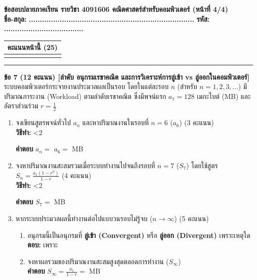 \documentclass[a4paper,12pt]{article}
\newcounter{examline}
\newcommand{\examlines}[1]{%
  \setcounter{examline}{0}%
  \loop\ifnum\value{examline}<#1\relax
    \par\vspace{0.68em}\noindent\textcolor{gray!40}{\hrulefill}%
    \stepcounter{examline}%
  \repeat
}
\newcommand{\examheadpage}[3]{%
  \noindent
  \begin{minipage}[c]{0.75\textwidth}
    {\normalsize\bfseries\color{navy} ข้อสอบปลายภาคเรียน รายวิชา 4091606 คณิตศาสตร์สำหรับคอมพิวเตอร์ (หน้าที่ #3/4)}\\[0.15em]
    \textbf{ชื่อ-สกุล:} {\large\bfseries #1} \qquad \textbf{รหัส:} {\large\bfseries #2}
  \end{minipage}\hfill
  \begin{minipage}[c]{0.23\textwidth}
    \flushright
    \begin{tabular}{|m{2.0cm}|}
      \hline
      \centering\scriptsize\textbf{คะแนนหน้านี้ (25)} \tabularnewline
      \hline
      \vspace{0.45cm} \tabularnewline
      \hline
    \end{tabular}
  \end{minipage}
  \par\vspace{0.2em}\hrule\vspace{0.35em}
}
\begin{document}
\clearpage

\examheadpage{...........................................................................}{....................................}{4}

\noindent\textbf{ข้อ 7 (12 คะแนน) [ลำดับ อนุกรมเรขาคณิต และการวิเคราะห์การลู่เข้า vs ลู่ออกในคอมพิวเตอร์]} \\
ระบบคอมพิวเตอร์กระจายงานประมวลผลเป็นรอบ โดยในแต่ละรอบ $n$ (สำหรับ $n = 1, 2, 3, \dots$) มีปริมาณภาระงาน (Workload) ตามลำดับเรขาคณิต ซึ่งมีพจน์แรก $a_1 = 128$ เมกะไบต์ (MB) และอัตราส่วนร่วม $r = \frac{1}{2}$
\begin{enumerate}[label=7.\arabic*), itemsep=3.5pt]
  \item จงเขียนสูตรพจน์ทั่วไป $a_n$ และหาปริมาณงานในรอบที่ $n = 6$ ($a_6$) (3 คะแนน)\\
  \noindent\textbf{วิธีทำ:}
  \examlines{2}
  \noindent\textbf{คำตอบ} $a_n =$ \makebox[4.5cm]{\dotfill} \qquad\qquad $a_6 =$ \makebox[4.0cm]{\dotfill} MB

  \item จงหาปริมาณงานสะสมรวมเมื่อระบบทำงานไปจนถึงรอบที่ $n = 7$ ($S_7$) โดยใช้สูตร $S_n = \frac{a_1(1 - r^n)}{1 - r}$ (4 คะแนน)\\
  \noindent\textbf{วิธีทำ:}
  \examlines{2}
  \noindent\textbf{คำตอบ} $S_7 =$ \makebox[6.5cm]{\dotfill} MB

  \item หากระบบประมวลผลนี้ทำงานต่อไปแบบวนรอบไม่รู้จบ ($n \to \infty$) (5 คะแนน)
  \begin{enumerate}[label=(\alph*), itemsep=2pt]
    \item อนุกรมนี้เป็นอนุกรมที่ \textbf{ลู่เข้า (Convergent)} หรือ \textbf{ลู่ออก (Divergent)} เพราะเหตุใด\\
    \noindent\textbf{ตอบ:} \makebox[3.5cm]{\dotfill} เพราะ \makebox[8.0cm]{\dotfill}
    \item จงหาผลรวมของปริมาณงานสะสมสูงสุดตลอดการทำงาน ($S_\infty$)\\
    \noindent\textbf{คำตอบ} $S_\infty = \frac{a_1}{1 - r} =$ \makebox[8.5cm]{\dotfill} MB
  \end{enumerate}
\end{enumerate}
\vspace{0.6em}
\end{document}
